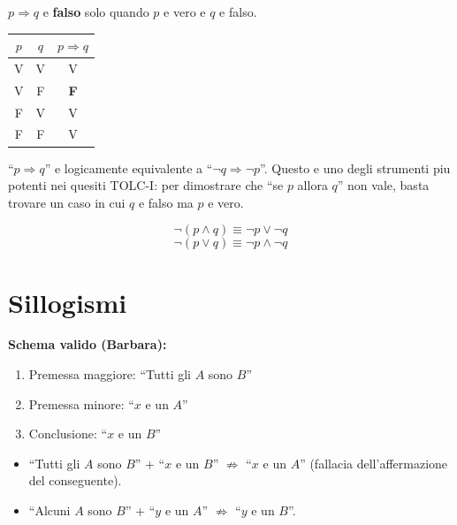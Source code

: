 \documentclass[12pt, a4paper, twoside, openright]{book}
\theoremstyle{definition}
\begin{document}
\begin{defbox}
$p \Rightarrow q$ e \textbf{falso} solo quando $p$ e vero e $q$ e falso.
\begin{center}
\begin{tabular}{cc|c}
\toprule
$p$ & $q$ & $p \Rightarrow q$ \\
\midrule
V & V & V \\
V & F & \textbf{F} \\
F & V & V \\
F & F & V \\
\bottomrule
\end{tabular}
\end{center}
\end{defbox}

\begin{attenzione}[Contronominale]
``$p \Rightarrow q$'' e logicamente equivalente a ``$\neg q \Rightarrow \neg p$''.
Questo e uno degli strumenti piu potenti nei quesiti TOLC-I: per dimostrare
che ``se $p$ allora $q$'' non vale, basta trovare un caso in cui $q$ e falso ma $p$ e vero.
\end{attenzione}

\begin{defbox}
\[
\neg(p \land q) \equiv \neg p \lor \neg q
\]
\[
\neg(p \lor q) \equiv \neg p \land \neg q
\]
\end{defbox}

\section{Sillogismi}

\begin{defbox}
\textbf{Schema valido (Barbara):}
\begin{enumerate}
  \item Premessa maggiore: ``Tutti gli $A$ sono $B$''
  \item Premessa minore: ``$x$ e un $A$''
  \item Conclusione: ``$x$ e un $B$'' \checkmark
\end{enumerate}
\end{defbox}

\begin{attenzione}
\begin{itemize}
  \item ``Tutti gli $A$ sono $B$'' + ``$x$ e un $B$'' $\not\Rightarrow$ ``$x$ e un $A$'' (fallacia dell'affermazione del conseguente).
  \item ``Alcuni $A$ sono $B$'' + ``$y$ e un $A$'' $\not\Rightarrow$ ``$y$ e un $B$''.
\end{itemize}
\end{attenzione}
\end{document}
